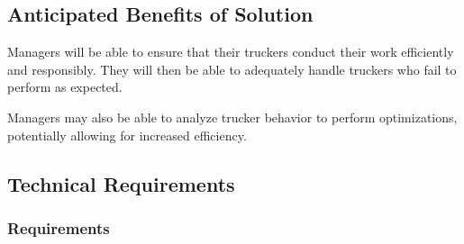 \subsection{Anticipated Benefits of Solution}
Managers will be able to ensure that their truckers conduct their work efficiently and responsibly.
They will then be able to adequately handle truckers who fail to perform as expected.

Managers may also be able to analyze trucker behavior to perform optimizations, potentially allowing for increased efficiency.

\subsection{Technical Requirements}
\subsubsection{Requirements}
